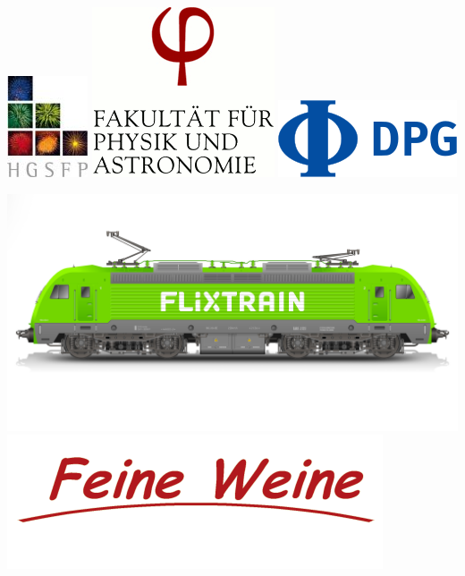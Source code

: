 \vspace*{3mm}
\includegraphics[width=.2\textwidth]{media/hgsfp}
\hspace*{2mm}
\includegraphics[width=.35\textwidth]{media/physik}
\hfill
\includegraphics[width=.4\textwidth]{media/dpg}

\includegraphics[width=.48\textwidth]{media/flixtrain}
\hfill
\includegraphics[width=.48\textwidth]{media/feineweine}

